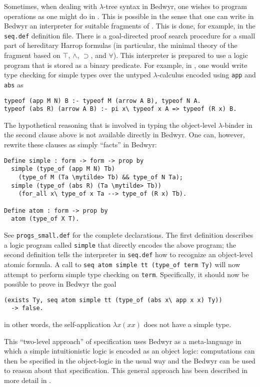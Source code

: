 Sometimes, when dealing with $\lambda$-tree syntax in Bedwyr, one
wishes to program operations as one might do in \lp{}.  This is possible
in the sense that one can write in Bedwyr an interpreter for suitable
fragments of \lp{}.  This is done, for example, in the {\tt seq.def}
definition file.  There is a goal-directed proof search procedure for a
small part of hereditary Harrop formulas (in particular, the minimal
theory of the fragment based on $\top$, $\wedge$, $\supset$, and
$\forall$).  This interpreter is prepared to use a logic program that
is stored as a binary predicate.  For example, in \lp{}, one would write
type checking for simple types over the untyped $\lambda$-calculus
encoded using {\tt app} and {\tt abs} as
\begin{verbatim}
typeof (app M N) B :- typeof M (arrow A B), typeof N A.
typeof (abs R) (arrow A B) :- pi x\ typeof x A => typeof (R x) B.
\end{verbatim}
The hypothetical reasoning that is involved in typing the object-level
$\lambda$-binder in the second clause above is not available directly
in Bedwyr.  One can, however, rewrite these clauses as simply
``facts'' in Bedwyr:
\begin{Verbatim}
Define simple : form -> form -> prop by
  simple (type_of (app M N) Tb)
    (type_of M (Ta \mytilde> Tb) && type_of N Ta);
  simple (type_of (abs R) (Ta \mytilde> Tb))
    (for_all x\ type_of x Ta --> type_of (R x) Tb).

Define atom : form -> prop by
  atom (type_of X T).
\end{Verbatim}
See \verb+progs_small.def+ for the complete declarations. The first
definition describes a logic program called {\tt simple} that directly
encodes the above \lp{} program; the second definition tells the
interpreter in {\tt seq.def} how to recognize an object-level atomic
formula.  A call to \texttt{seq atom simple tt (type\_of term Ty)} will
now attempt to perform simple type checking on {\tt term}.
Specifically, it should now be possible to prove in Bedwyr the goal
\begin{verbatim}
(exists Ty, seq atom simple tt (type_of (abs x\ app x x) Ty))
  -> false.
\end{verbatim}
in other words, the self-application $\lambda x(x x)$ does not have a
simple type.

This ``two-level approach'' of specification uses Bedwyr as a
meta-language in which a simple intuitionistic logic is encoded as an
object logic: computations can then be specified in the object-logic
in the usual way and the Bedwyr can be used to reason about that specification.
This general approach has been described in more detail in
\cite{miller06ijcar,gacek.twolevel}.

